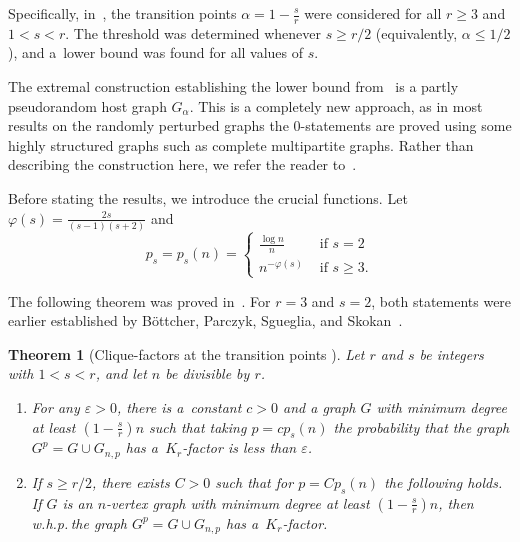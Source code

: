 \documentclass[reqno, 12pt]{amsart}
\numberwithin{equation}{section}
\numberwithin{figure}{section}
\theoremstyle{plain}
\newtheorem{thm}{Theorem}[section]
\theoremstyle{definition}
\let\eps=\varepsilon
\def \Gnp{G_{n,p}}
\begin{document}
    \smallskip
    

    Specifically, in~\cite{akr24}, the transition points $\alpha = 1-\frac sr$ were considered for all $r \geq 3$ and $1<s<r$. The threshold was determined whenever $s \geq r/2$ (equivalently, $\alpha \leq 1/2$), and a~lower bound was found for all values of $s$. 

    The extremal construction establishing the lower bound from~\cite{akr24} is a partly pseudorandom host graph $G_\alpha$. This is a completely new approach, as in most results on the randomly perturbed graphs the 0-statements are proved using some highly structured graphs such as complete multipartite graphs. Rather than describing the construction here, we refer the reader to~\cite{akr24}.
    
    Before stating the results, we introduce the crucial functions. Let 
	\(\varphi(s) = \frac{2s}{(s-1)(s+2)}\)
	and 
	\[p_s = p_s(n) = \begin{cases} 
		\frac{\log n}{n} & \text{ if } s=2 \\
		n^{-\varphi(s)} & \text{ if } s\geq 3.
	\end{cases} \]

    The following theorem was proved in~\cite{akr24}. For $r=3$ and $s=2$, both statements were earlier established by B{\"o}ttcher, Parczyk, Sgueglia, and Skokan~\cite{bpss23}.
    \begin{thm}[Clique-factors at the transition points \cite{akr24}]
    \label{thm:main_in_AKR}
		Let $r$ and $s$ be integers with $1 < s <r$, and let $n$ be divisible by $r$.
        \begin{enumerate}
            \item For any $\eps>0$, there is a~constant $c>0$ and a graph $G$ with minimum degree at least $\left(1 - \frac{s}{r} \right)n$ such that taking $p = cp_s(n)$ the probability that the graph $G^p = G \cup \Gnp$ has a~$K_r$-factor is less than $\eps$.
            \item If $s \geq r/2$, there exists $C>0$ such that for $p = Cp_s(n)$ the following holds. If $G$ is an $n$-vertex graph with minimum degree at least $\left(1 - \frac{s}{r} \right)n$, then  w.h.p.\,the graph $G^p = G \cup \Gnp$ has a~$K_r$-factor.
        \end{enumerate}
	\end{thm}
	 
\end{document}
